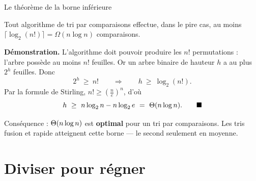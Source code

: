 \documentclass[11pt,aspectratio=169]{beamer}
\begin{document}
\begin{frame}[shrink=15]{Le théorème de la borne inférieure}
\begin{encadre}[title=Théorème,fonttitle=\bfseries]
Tout algorithme de tri par comparaisons effectue, dans le pire cas, au moins
$\big\lceil\log_2(n!)\big\rceil = \Omega(n\log n)$ comparaisons.
\end{encadre}
\pause
\vspace{4pt}
\textbf{Démonstration.} L'algorithme doit pouvoir produire les $n!$ permutations : l'arbre
possède au moins $n!$ feuilles. Or un arbre binaire de hauteur $h$ a au plus $2^h$ feuilles.
Donc
\[
2^h\ \ge\ n!\qquad\Longrightarrow\qquad h\ \ge\ \log_2(n!).
\]
Par la formule de Stirling, $n!\ge\left(\frac ne\right)^n$, d'où
\[
h\ \ge\ n\log_2 n - n\log_2 e\ =\ \Th(n\log n).\qquad\blacksquare
\]
\pause
\vspace{2pt}
\begin{attention}\small
Conséquence : $\Theta(n\log n)$ est \textbf{optimal} pour un tri par comparaisons.
Les tris fusion et rapide atteignent cette borne --- le second seulement en moyenne.
\end{attention}
\end{frame}

\section{Diviser pour régner}
\end{document}
